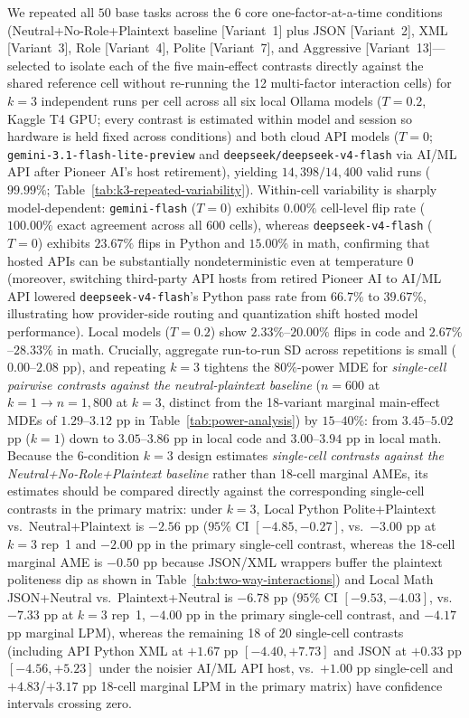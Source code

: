 \documentclass[a4paper,fleqn]{cas-sc}
\begin{document}
We repeated all $50$ base tasks across the $6$ core one-factor-at-a-time conditions (Neutral+No-Role+Plaintext baseline [Variant~1] plus JSON [Variant~2], XML [Variant~3], Role [Variant~4], Polite [Variant~7], and Aggressive [Variant~13]—selected to isolate each of the five main-effect contrasts directly against the shared reference cell without re-running the 12 multi-factor interaction cells) for $k = 3$ independent runs per cell across all six local Ollama models ($T = 0.2$, Kaggle T4 GPU; every contrast is estimated within model and session so hardware is held fixed across conditions) and both cloud API models ($T = 0$; \texttt{gemini-3.1-flash-lite-preview} and \texttt{deepseek/deepseek-v4-flash} via AI/ML API after Pioneer AI's host retirement), yielding $14{,}398 / 14{,}400$ valid runs ($99.99\%$; Table~\ref{tab:k3-repeated-variability}). Within-cell variability is sharply model-dependent: \texttt{gemini-flash} ($T = 0$) exhibits $0.00\%$ cell-level flip rate ($100.00\%$ exact agreement across all $600$ cells), whereas \texttt{deepseek-v4-flash} ($T = 0$) exhibits $23.67\%$ flips in Python and $15.00\%$ in math, confirming that hosted APIs can be substantially nondeterministic even at temperature $0$ (moreover, switching third-party API hosts from retired Pioneer AI to AI/ML API lowered \texttt{deepseek-v4-flash}'s Python pass rate from $66.7\%$ to $39.67\%$, illustrating how provider-side routing and quantization shift hosted model performance). Local models ($T = 0.2$) show $2.33\%$--$20.00\%$ flips in code and $2.67\%$--$28.33\%$ in math. Crucially, aggregate run-to-run SD across repetitions is small ($0.00$--$2.08$ pp), and repeating $k = 3$ tightens the $80\%$-power MDE for \emph{single-cell pairwise contrasts against the neutral-plaintext baseline} ($n = 600$ at $k = 1 \to n = 1{,}800$ at $k = 3$, distinct from the 18-variant marginal main-effect MDEs of $1.29$--$3.12$ pp in Table~\ref{tab:power-analysis}) by $15$--$40\%$: from $3.45$--$5.02$ pp ($k = 1$) down to $3.05$--$3.86$ pp in local code and $3.00$--$3.94$ pp in local math. Because the 6-condition $k = 3$ design estimates \emph{single-cell contrasts against the Neutral+No-Role+Plaintext baseline} rather than 18-cell marginal AMEs, its estimates should be compared directly against the corresponding single-cell contrasts in the primary matrix: under $k = 3$, Local Python Polite+Plaintext vs.\ Neutral+Plaintext is $-2.56$ pp ($95\%$ CI $[-4.85, -0.27]$, vs.\ $-3.00$ pp at $k = 3$ rep~1 and $-2.00$ pp in the primary single-cell contrast, whereas the 18-cell marginal AME is $-0.50$ pp because JSON/XML wrappers buffer the plaintext politeness dip as shown in Table~\ref{tab:two-way-interactions}) and Local Math JSON+Neutral vs.\ Plaintext+Neutral is $-6.78$ pp ($95\%$ CI $[-9.53, -4.03]$, vs.\ $-7.33$ pp at $k = 3$ rep~1, $-4.00$ pp in the primary single-cell contrast, and $-4.17$ pp marginal LPM), whereas the remaining 18 of 20 single-cell contrasts (including API Python XML at $+1.67$ pp $[-4.40, +7.73]$ and JSON at $+0.33$ pp $[-4.56, +5.23]$ under the noisier AI/ML API host, vs.\ $+1.00$ pp single-cell and $+4.83$/$+3.17$ pp 18-cell marginal LPM in the primary matrix) have confidence intervals crossing zero.
\end{document}
